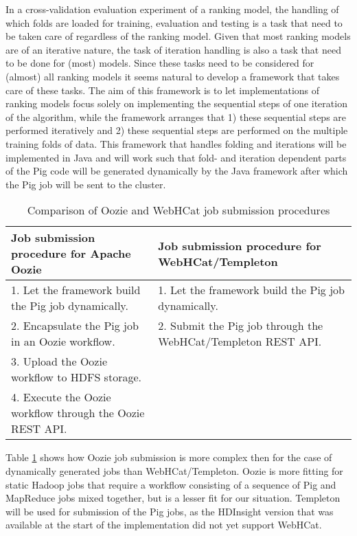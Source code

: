 In a cross-validation evaluation experiment of a ranking model, the handling of which folds are loaded for training, evaluation and testing is a task that need to be taken care of regardless of the ranking model. Given that most ranking models are of an iterative nature, the task of iteration handling is also a task that need to be done for (most) models. Since these tasks need to be considered for (almost) all ranking models it seems natural to develop a framework that takes care of these tasks. The aim of this framework is to let implementations of ranking models focus solely on implementing the sequential steps of one iteration of the algorithm, while the framework arranges that 1) these sequential steps are performed iteratively and 2) these sequential steps are performed on the multiple training folds of data. This framework that handles folding and iterations will be implemented in Java and will work such that fold- and iteration dependent parts of the Pig code will be generated dynamically by the Java framework after which the Pig job will be sent to the cluster.\\

\begin{table}
\centering
\begin{tabular}{p{5cm}p{5cm}}\toprule
Job submission procedure for Apache Oozie & Job submission procedure for WebHCat/Templeton \\
\midrule
1. Let the framework build the Pig job dynamically. & 1. Let the framework build the Pig job dynamically.\\
2. Encapsulate the Pig job in an Oozie workflow. & 2. Submit the Pig job through the WebHCat/Templeton REST API.\\
3. Upload the Oozie workflow to HDFS storage. & \\
4. Execute the Oozie workflow through the Oozie REST API. & \\
\bottomrule
\end{tabular}
\caption{Comparison of Oozie and WebHCat job submission procedures}
\label{tbl:oozie_templeton}
\end{table}

Table \ref{tbl:oozie_templeton} shows how Oozie job submission is more complex then for the case of dynamically generated jobs than WebHCat/Templeton. Oozie is more fitting for static Hadoop jobs that require a workflow consisting of a sequence of Pig and MapReduce jobs mixed together, but is a lesser fit for our situation. Templeton will be used for submission of the Pig jobs, as the HDInsight version that was available at the start of the implementation did not yet support WebHCat.

